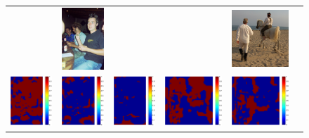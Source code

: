 
\begin{figure} 
  \centering          
  \begin{tabular}{c c c | c c c}
    & \includegraphics[height=0.1\linewidth, width=0.1\linewidth]{fig/voc10_part/img/2008_000034.jpg} & & & \includegraphics[height=0.1\linewidth, width=0.1\linewidth]{fig/voc10_part/img/2008_003344.jpg} & \\
   \includegraphics[height=0.1\linewidth, width=0.14\linewidth]{fig/voc10_part/att1/2008_000034_max.pdf} &
   \includegraphics[height=0.1\linewidth, width=0.14\linewidth]{fig/voc10_part/att2/2008_000034_max.pdf} &
   \includegraphics[height=0.1\linewidth, width=0.14\linewidth]{fig/voc10_part/att3/2008_000034_max.pdf} &
   \includegraphics[height=0.1\linewidth, width=0.14\linewidth]{fig/voc10_part/att1/2008_003344_max.pdf} &
   \includegraphics[height=0.1\linewidth, width=0.14\linewidth]{fig/voc10_part/att2/2008_003344_max.pdf} &

\end{tabular}
\end{figure}
